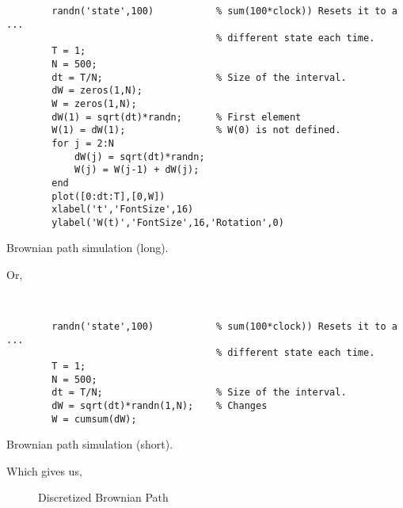 \documentclass[12pt,a4paper]{article}
\begin{document}
\begin{program}
\begin{scriptsize}
\begin{verbatim}       


        randn('state',100)           % sum(100*clock)) Resets it to a ...
                                     % different state each time.
        T = 1; 
        N = 500; 
        dt = T/N;                    % Size of the interval.
        dW = zeros(1,N);             
        W = zeros(1,N);              
        dW(1) = sqrt(dt)*randn;      % First element 
        W(1) = dW(1);                % W(0) is not defined.
        for j = 2:N
            dW(j) = sqrt(dt)*randn;   
            W(j) = W(j-1) + dW(j); 
        end
        plot([0:dt:T],[0,W])   
        xlabel('t','FontSize',16)
        ylabel('W(t)','FontSize',16,'Rotation',0)
\end{verbatim}
\end{scriptsize}
  \caption{Brownian path simulation (long).}
\end{program}
\newpage
Or, 
\begin{program}
\begin{scriptsize}
				\begin{verbatim}
				
				
        randn('state',100)           % sum(100*clock)) Resets it to a ...
                                     % different state each time.
        T = 1; 
        N = 500; 
        dt = T/N;                    % Size of the interval.
        dW = sqrt(dt)*randn(1,N);    % Changes 
        W = cumsum(dW);                
				\end{verbatim}
\end{scriptsize}
  \caption{Brownian path simulation (short).}
\end{program}

\noindent Which gives us, 

\begin{figure}[H]
\caption{Discretized Brownian Path}  \label{fig1}
\begin{center}
\end{center}
\end{figure}
\end{document}
